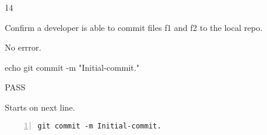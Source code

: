 \begin{description}[align=right,leftmargin=3.2cm,labelindent=3.0cm]
\item[Step:] 14
\item[Confirm:] Confirm a developer is able to commit files f1 and f2 to the local repo.
\item[Expectation:] No errror.
\item[Command:] echo git  commit -m "Initial-commit."
\item[Test Result:] PASS
\item[Evidence:] Starts on next line.
\end{description}
\begin{lstlisting}[numbers=left]
git commit -m Initial-commit.

\end{lstlisting}
